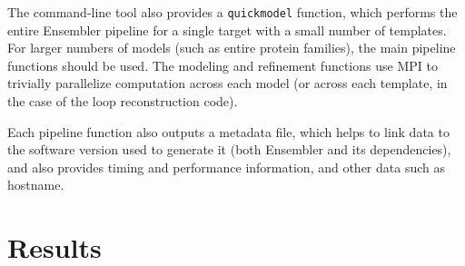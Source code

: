 \documentclass[aps,pre,twocolumn,nofootinbib,superscriptaddress,linenumbers]{revtex4-1}
\begin{document}
The command-line tool also provides a {\tt quickmodel} function, which performs the entire Ensembler pipeline for a single target with a small number of templates.
For larger numbers of models (such as entire protein families), the main pipeline functions should be used.
The modeling and refinement functions use MPI to trivially parallelize computation across each model (or across each template, in the case of the loop reconstruction code).

Each pipeline function also outputs a metadata file, which helps to link data to the software version used to generate it (both Ensembler and its dependencies), and also provides timing and performance information, and other data such as hostname.






\label{section:design}

\section{Results}
\label{section:results}
\end{document}
